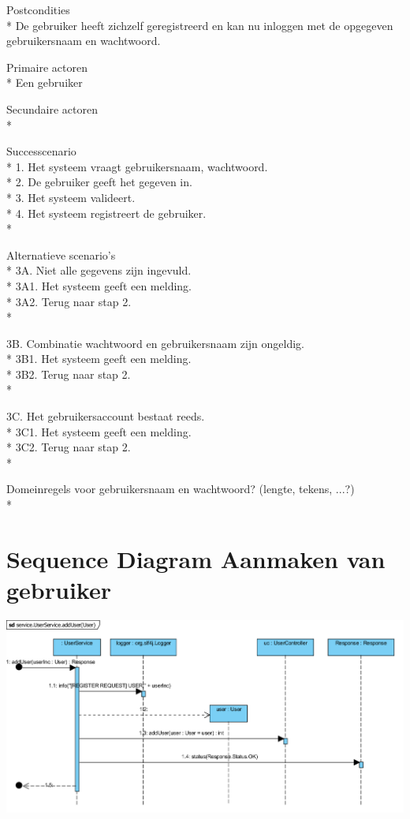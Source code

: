\documentclass[pdftex,a4paper,12pt,twoside]{report}
\begin{document}
Postcondities \\*
De gebruiker heeft zichzelf geregistreerd en kan nu inloggen met de opgegeven gebruikersnaam en wachtwoord.

Primaire actoren \\*
Een gebruiker

Secundaire actoren \\*

Successcenario\\*
1.	Het systeem vraagt gebruikersnaam, wachtwoord.\\*
2.	De gebruiker geeft het gegeven in.\\*
3.	Het systeem valideert.\\*
4.	Het systeem registreert de gebruiker.\\*

Alternatieve scenario’s\\*
3A. Niet alle gegevens zijn ingevuld.\\*
3A1. Het systeem geeft een melding.\\*
3A2. Terug naar stap 2.\\*

3B. Combinatie wachtwoord en gebruikersnaam zijn ongeldig.\\*
3B1. Het systeem geeft een melding.\\*
3B2. Terug naar stap 2.\\*

3C. Het gebruikersaccount bestaat reeds.\\*
3C1. Het systeem geeft een melding.\\*
3C2. Terug naar stap 2.\\*


Domeinregels voor gebruikersnaam en wachtwoord? (lengte, tekens, ...?)\\*
\section{Sequence Diagram Aanmaken van gebruiker}
\includegraphics[width=\textwidth]{images/aanmakenuser.png}
\end{document}
